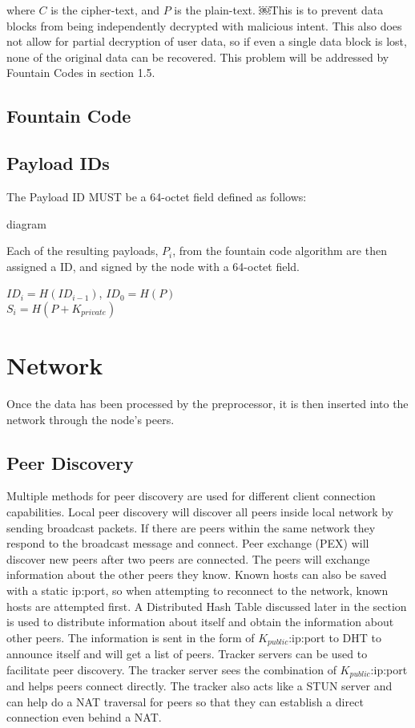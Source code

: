 \documentclass[journal]{IEEEtran}
\begin{document}
\noindent
where $C$ is the cipher-text, and $P$ is the plain-text. ￼This is to prevent data blocks from being independently decrypted with malicious intent. This also does not allow for partial decryption of user data, so if even a single data block is lost, none of the original data can be recovered. This problem will be addressed by Fountain Codes in section 1.5.

\subsection{Fountain Code}


\subsection{Payload IDs}
The Payload ID MUST be a 64-octet field defined as follows:

diagram

Each of the resulting payloads, $P_i$, from the fountain code algorithm are then assigned a ID, and signed by the node with a 64-octet field.

\begin{center}
$ID_i = H(ID_{i-1})$, $ID_0 = H(P)$\\
$S_i = H(P + K_{private})$
\end{center}

\section{Network}
Once the data has been processed by the preprocessor, it is then inserted into the network through the node's peers.

\subsection{Peer Discovery} %
Multiple methods for peer discovery are used for different client connection capabilities. Local peer discovery will discover all peers inside local network by sending broadcast packets. If there are peers within the same network they respond to the broadcast message and connect. Peer exchange (PEX) will discover new peers after two peers are connected. The peers will exchange information about the other peers they know. Known hosts can also be saved with a static ip:port, so when attempting to reconnect to the network, known hosts are attempted first. A Distributed Hash Table discussed later in the section is used to distribute information about itself and obtain the information about other peers. The information is sent in the form of $K_{public}$:ip:port to DHT to announce itself and will get a list of peers. Tracker servers can be used to facilitate peer discovery. The tracker server sees the combination of $K_{public}$:ip:port and helps peers connect directly. The tracker also acts like a STUN server and can help do a NAT traversal for peers so that they can establish a direct connection even behind a NAT.
\end{document}
